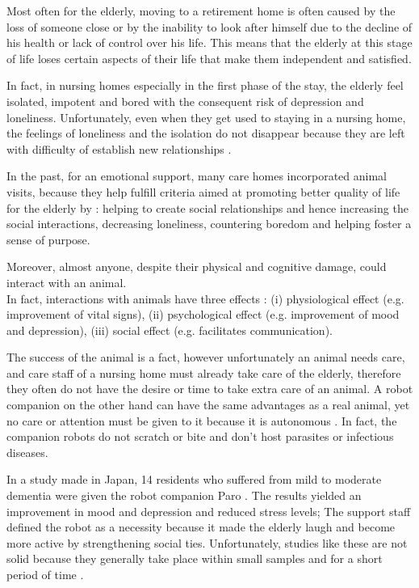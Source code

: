 \documentclass{thesisreport}
\begin{document}
 Most often for the elderly, moving to a retirement home is often caused by the loss of someone close or by the inability to look after himself due to the decline of his health or lack of control over his life.
 This means that the elderly at this stage of life loses certain aspects of their life that make them independent and satisfied.
 
 In fact, in nursing homes especially in the first phase of the stay, the elderly feel isolated, impotent and bored with the consequent risk of depression and loneliness.
 Unfortunately, even when they get used to staying in a nursing home, the feelings of loneliness and the isolation do not disappear because they are left with difficulty of establish new relationships \cite{assistiveRobots}.
 
 In the past, for an emotional support, many care homes incorporated animal visits, because they help fulfill criteria aimed at promoting better quality of life for the elderly by \cite{psicologicalEffects}: helping to create social relationships and hence increasing the social interactions, decreasing loneliness, countering boredom and helping foster a sense of purpose. 
 
 Moreover, almost anyone, despite their physical and cognitive damage, could interact with an animal.  \\
 In fact, interactions with animals have three effects \cite{psicologicalEffects}: (i) physiological effect (e.g. improvement of vital signs), (ii) psychological effect (e.g. improvement of mood and depression), (iii) social effect (e.g. facilitates communication).

 The success of the animal is a fact, however unfortunately an animal needs care, and care staff of a nursing home must already take care of the elderly, therefore they often do not have the desire or time to take extra care of an animal.
 A robot companion on the other hand can have the same advantages as a real animal, yet no care or attention must be given to it because it is autonomous \cite{psicologicalEffects}.
 In fact, the companion robots do not scratch or bite and don't host parasites or infectious diseases.
 
 In a study made in Japan, 14 residents who suffered from mild to moderate dementia were given the robot companion Paro \cite{wada2009long}. The results yielded an improvement in mood and depression and reduced stress levels; 
 The support staff defined the robot as a necessity because it made the elderly laugh and become more active by strengthening social ties.
 Unfortunately, studies like these are not solid because they generally take place within small samples and for a short period of time \cite{psicologicalEffects}.
 
\end{document}
